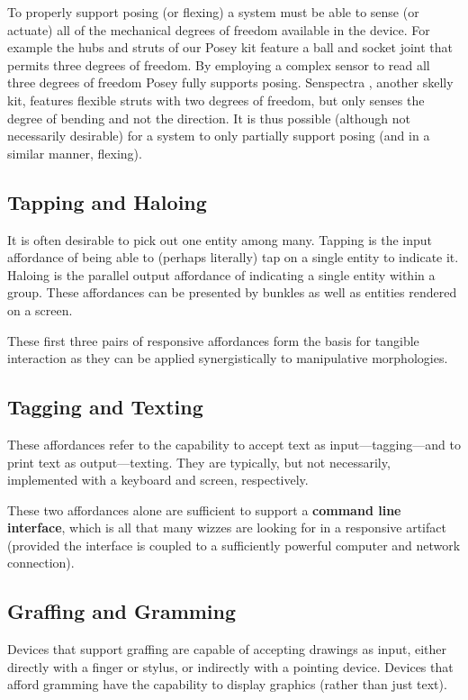 To properly support posing (or flexing) a system must be able to sense (or actuate) all of the mechanical degrees of freedom available in the device. For example the hubs and struts of our Posey kit feature a ball and socket joint that permits three degrees of freedom. By employing a complex sensor to read all three degrees of freedom Posey fully supports posing. Senspectra \citep{senspectra}, another skelly kit, features flexible struts with two degrees of freedom, but only senses the degree of bending and not the direction. It is thus possible (although not necessarily desirable) for a system to only partially support posing (and in a similar manner, flexing).

\subsection{Tapping and Haloing}
%
It is often desirable to pick out one entity among many. Tapping is the input affordance of being able to (perhaps literally) tap on a single entity to indicate it. Haloing is the parallel output affordance of indicating a single entity within a group. These affordances can be presented by bunkles as well as entities rendered on a screen.

These first three pairs of responsive affordances form the basis for tangible interaction as they can be applied synergistically to manipulative morphologies.

\subsection{Tagging and Texting}
%
These affordances refer to the capability to accept text as input---tagging---and to print text as output---texting. They are typically, but not necessarily, implemented with a keyboard and screen, respectively.

These two affordances alone are sufficient to support a \textbf{command line interface}, which is all that many wizzes are looking for in a responsive artifact (provided the interface is coupled to a sufficiently powerful computer and network connection).

\subsection{Graffing and Gramming}
%
Devices that support graffing are capable of accepting drawings as input, either directly with a finger or stylus, or indirectly with a pointing device. Devices that afford gramming have the capability to display graphics (rather than just text).

